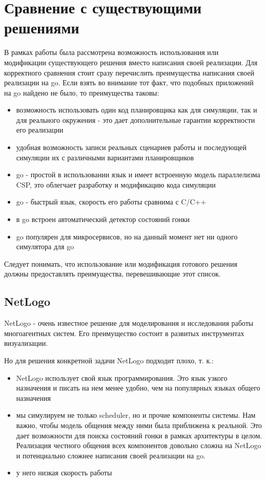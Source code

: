 \chapter{Сравнение с существующими решениями}

В рамках работы была рассмотрена возможность использования или модификации существующего решения вместо написания своей реализации. Для корректного сравнения стоит сразу перечислить преимущества написания своей реализации на go. Если взять во внимание тот факт, что подобных приложений на go найдено не было, то преимущества таковы:

\begin{itemize}
	\item возможность использовать один код планировщика как для симуляции, так и для реального окружения - это дает дополнительные гарантии корректности его реализации
	\item удобная возможность записи реальных сценариев работы и последующей симуляции их с различными вариантами планировщиков
	\item go - простой в использовании язык и имеет встроенную модель параллелизма CSP, это облегчает разработку и модификацию кода симуляции
	\item go - быстрый язык, скорость его работы сравнима с C/C++
	\item в go встроен автоматический детектор состояний гонки
	\item go популярен для микросервисов, но на данный момент нет ни одного симулятора для go
\end{itemize}

Следует понимать, что использование или модификация готового решения должны предоставлять преимущества, перевешивающие этот список.

\section{NetLogo}

NetLogo\cite{tisue2004netlogo} - очень известное решение для моделирования и исследования работы многоагентных систем. Его преимущество состоит в развитых инструментах визуализации.

Но для решения конкретной задачи NetLogo подходит плохо, т. к.:

\begin{itemize}
	\item NetLogo использует свой язык программирования. Это язык узкого назначения и писать на нем менее удобно, чем на популярных языках общего назначения
	\item мы симулируем не только scheduler, но и прочие компоненты системы. Нам важно, чтобы модель общения между ними была приближена к реальной. Это дает возможности для поиска состояний гонки в рамках архитектуры в целом. Реализация честного общения всех компонентов довольно сложна на NetLogo и потенциально сложнее написания своей реализации на go.
	\item у него низкая скорость работы
\end{itemize}

